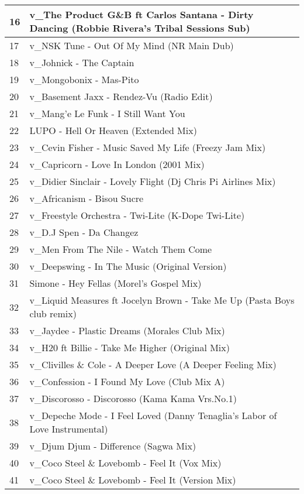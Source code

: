 \begin{appendices}
\begin{longtable}{| p{} | p{} |}
\hline
16 & v{\_}The Product G{\&}B ft Carlos Santana - Dirty Dancing (Robbie Rivera's Tribal Sessions Sub)\\
\hline
17 & v{\_}NSK Tune - Out Of My Mind (NR Main Dub)\\
\hline
18 & v{\_}Johnick - The Captain\\
\hline
19 & v{\_}Mongobonix - Mas-Pito \\
\hline
20 & v{\_}Basement Jaxx - Rendez-Vu (Radio Edit)\\
\hline
21 & v{\_}Mang'e Le Funk - I Still Want You\\
\hline
22 & LUPO - Hell Or Heaven (Extended Mix)\\
\hline
23 & v{\_}Cevin Fisher - Music Saved My Life (Freezy Jam Mix)\\
\hline
24 & v{\_}Capricorn - Love In London (2001 Mix)\\
\hline 
25 & v{\_}Didier Sinclair - Lovely Flight (Dj Chris Pi Airlines Mix)\\
\hline
26 & v{\_}Africanism - Bisou Sucre\\
\hline
27 & v{\_}Freestyle Orchestra - Twi-Lite (K-Dope Twi-Lite)\\
\hline
28 & v{\_}D.J Spen - Da Changez\\
\hline
29 & v{\_}Men From The Nile - Watch Them Come\\
\hline
30 & v{\_}Deepswing - In The Music (Original Version)\\
\hline
31 & Simone - Hey Fellas (Morel's Gospel Mix)\\
\hline
32 & v{\_}Liquid Measures ft Jocelyn Brown - Take Me Up (Pasta Boys club remix)\\
\hline
33 & v{\_}Jaydee - Plastic Dreams (Morales Club Mix)\\
\hline
34 & v{\_}H20 ft Billie - Take Me Higher (Original Mix)\\
\hline
35 & v{\_}Clivilles {\&} Cole - A Deeper Love (A Deeper Feeling Mix)\\
\hline
36 & v{\_}Confession - I Found My Love (Club Mix A)\\
\hline
37 & v{\_}Discorosso - Discorosso (Kama Kama Vrs.No.1)\\
\hline 
38 & v{\_}Depeche Mode - I Feel Loved (Danny Tenaglia's Labor of Love Instrumental)\\
\hline
39 & v{\_}Djum Djum - Difference (Sagwa Mix)\\
\hline
40 & v{\_}Coco Steel {\&} Lovebomb - Feel It (Vox Mix)\\
\hline
41 & v{\_}Coco Steel {\&} Lovebomb - Feel It (Version Mix)\\

\end{longtable}
\end{appendices}
